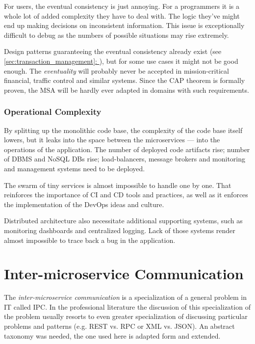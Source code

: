 \documentclass[thesis=M,english,hidelinks]{FITthesis}[2012/10/20]
\newcommand*{\fullref}[1]{\hyperref[{#1}]{\autoref*{#1}: \textit{\nameref*{#1}}}}
\begin{document}
For users, the eventual consistency is just annoying. For a programmers it is a whole lot of added complexity they have to deal with. The logic they've might end up making decisions on inconsistent information. This issue is exceptionally difficult to debug as the numbers of possible situations may rise extremely.

Design patterns guaranteeing the eventual consistency already exist (see \fullref{sec:transaction_management}), but for some use cases it might not be good enough. The \textit{eventuality} will probably never be accepted in mission-critical financial, traffic control and similar systems. Since the \acrshort{CAP} theorem is formally proven, the \acrshort{MSA} will be hardly ever adapted in domains with such requirements.

\subsubsection{Operational Complexity}
By splitting up the monolithic code base, the complexity of the code base itself lowers, but it leaks into the space between the microservices --- into the operations of the application. The number of deployed code artifacts rise; number of \acrshort{DBMS} and NoSQL \acrshort{DB}s rise; load-balancers, message brokers and monitoring and management systems need to be deployed.

The swarm of tiny services is almost impossible to handle one by one. That reinforces the importance of \acrfull{CI} and \acrfull{CD} tools and practices, as well as it enforces the implementation of the DevOps ideas and culture.

Distributed architecture also necessitate additional supporting systems, such as monitoring dashboards and centralized logging. Lack of those systems render almost impossible to trace back a bug in the application.

% 
% 

\section{Inter-microservice Communication}
\label{sec:inter-service-communication}

The \textit{inter-microservice communication} is a specialization of a general problem in \acrshort{IT} called \acrfull{IPC}. In the professional literature the discussion of this specialization of the problem usually resorts to even greater specialization of discussing particular problems and patterns (e.g. \acrshort{REST} vs. \acrshort{RPC} or \acrshort{XML} vs. \acrshort{JSON}). An abstract taxonomy was needed, the one used here is adapted form \cite{ms-taxonomy} and extended.
\end{document}
